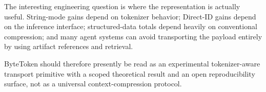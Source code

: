 \documentclass[11pt,a4paper]{article}
\begin{document}
The interesting engineering question is where the representation is actually useful. String-mode gains depend on tokenizer behavior; Direct-ID gains depend on the inference interface; structured-data totals depend heavily on conventional compression; and many agent systems can avoid transporting the payload entirely by using artifact references and retrieval.

ByteToken should therefore presently be read as an experimental tokenizer-aware transport primitive with a scoped theoretical result and an open reproducibility surface, not as a universal context-compression protocol.



\end{document}
